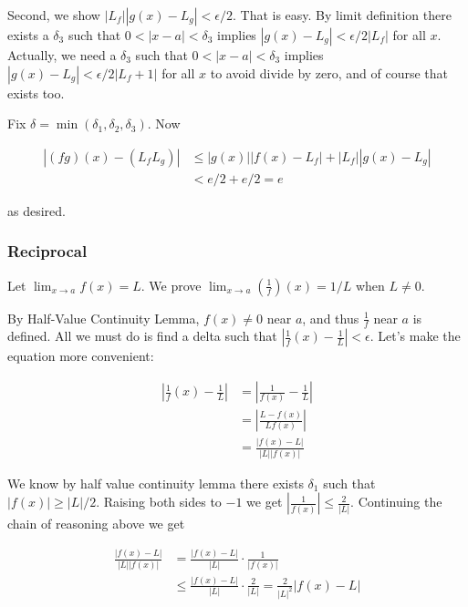 \vs

Second, we show $|L_f||g(x)-L_g|<\epsilon/2$. That is easy. By limit
definition there exists a $\delta_3$ such that $0<|x-a|<\delta_3$ implies
$|g(x)-L_g|<\epsilon/2|L_f|$ for all $x$. Actually, we need a
$\delta_3$ such that $0<|x-a|<\delta_3$ implies
$|g(x)-L_g|<\epsilon/2|L_f+1|$ for all $x$ to avoid divide by zero, and of
course that exists too.

\vs

Fix $\delta=\min(\delta_1, \delta_2, \delta_3)$. Now

\begin{align*}
    |(fg)(x)-(L_fL_g)|&\leq |g(x)||f(x)-L_f|+|L_f||g(x)-L_g|\\
    &<e/2+e/2=e
\end{align*}

as desired.

\subsubsection*{Reciprocal}

Let $\lim_{x\to a}f(x)=L$. We prove $\lim_{x\to a}\left(\frac{1}{f}\right)(x)=1/L$ when $L\neq 0$.

\vs

By Half-Value Continuity Lemma, $f(x)\neq 0$ near $a$, and thus
$\frac{1}{f}$ near $a$ is defined. All we must do is find a delta such
that $\left|\frac{1}{f}(x)-\frac{1}{L}\right|<\epsilon$. Let's make the
equation more convenient:

\begin{align*}
    \left|\frac{1}{f}(x)-\frac{1}{L}\right|&=\left|\frac{1}{f(x)}-\frac{1}{L}\right|\\
    &=\left|\frac{L-f(x)}{Lf(x)}\right|\\
    &=\frac{|f(x)-L|}{|L||f(x)|}
\end{align*}

We know by half value continuity lemma there exists $\delta_1$ such that
$|f(x)|\geq |L|/2$. Raising both sides to $-1$ we get
$|\frac{1}{f(x)}|\leq \frac{2}{|L|}$. Continuing the chain of reasoning
above we get

\begin{align*}
    \frac{|f(x)-L|}{|L||f(x)|}&=\frac{|f(x)-L|}{|L|}\cdot\frac{1}{|f(x)|}\\
    &\leq\frac{|f(x)-L|}{|L|}\cdot\frac{2}{|L|}=\frac{2}{|L|^2}|f(x)-L|\\
\end{align*}

